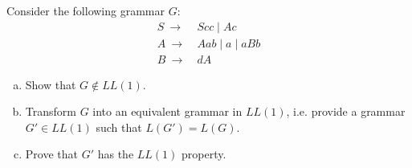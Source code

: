 \begin{exercise}{20}
 Consider the following grammar $G$:
 \begin{align*}
    S ~\to~ & Scc \mid Ac \\
    A ~\to~ & Aab \mid a \mid aBb \\
    B ~\to~ & dA
 \end{align*}
 \begin{enumerate}[(a)]
    \item Show that $G \notin LL(1)$.
    \item Transform $G$ into an equivalent grammar in $LL(1)$, i.e. provide a grammar $G' \in LL(1)$ such that $L(G') = L(G)$.
    \item Prove that $G'$ has the $LL(1)$ property.
 \end{enumerate}

\end{exercise}

